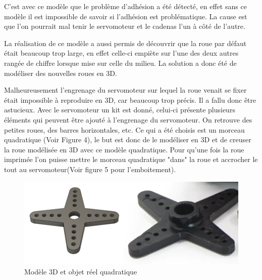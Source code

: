 \documentclass[twoside]{article}
\begin{document}
\begin{multicols}{2}
C'est avec ce modèle que le problème d'adhésion a été détecté, en effet sans ce modèle il est impossible de savoir si l'adhésion est problématique. La cause est que l'on pourrait mal tenir le servomoteur et le cadenas l'un à côté de l'autre.

La réalisation de ce modèle a aussi permis de découvrir que la roue par défaut était beaucoup trop large, en effet celle-ci empiète sur l'une des deux autres rangée de chiffre lorsque mise sur celle du milieu. La solution a donc été de modéliser des nouvelles roues en 3D.

Malheureusement l'engrenage du servomoteur sur lequel la roue venait se fixer était impossible à reproduire en 3D, car beaucoup trop précis. Il a fallu donc être astucieux. Avec le servomoteur un kit est donné, celui-ci présente plusieurs éléments qui peuvent être ajouté à l'engrenage du servomoteur. On retrouve des petites roues, des barres horizontales, etc. Ce qui a été choisis est un morceau quadratique (Voir Figure 4), le but est donc de le modéliser en 3D et de creuser la roue modélisée en 3D avec ce modèle quadratique. Pour qu'une fois la roue imprimée l'on puisse mettre le morceau quadratique "dans" la roue et accrocher le tout au servomoteur(Voir figure 5 pour l'emboitement).
\begin{figure}[H]
\centering
\includegraphics[scale=0.5]{quadthingmodelreal.png}
\caption{Modèle 3D et objet réel quadratique}
\end{figure}


\end{multicols}
\end{document}
